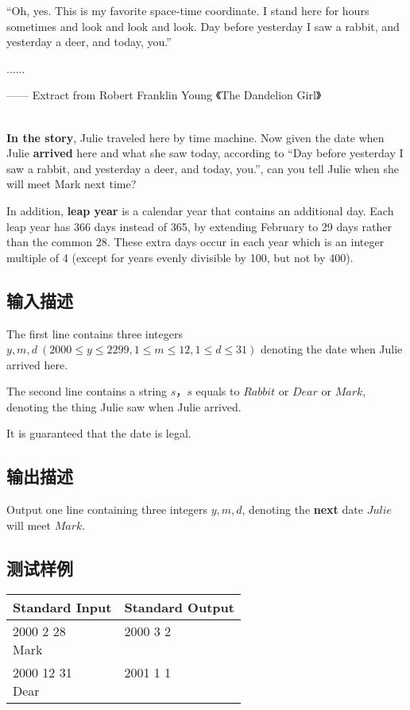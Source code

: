 ``Oh, yes. This is my favorite space-time coordinate. I stand here for hours sometimes and look and look and look. Day before yesterday I saw a rabbit, and yesterday a deer, and today, you.''

......

{\hfill —— Extract from Robert Franklin Young 《The Dandelion Girl》}

~\\

\textbf{In the story}, Julie traveled here by time machine. Now given the date when Julie \textbf{arrived} here and what she saw today, according to ``Day before yesterday I saw a rabbit, and yesterday a deer, and today, you.'', can you tell Julie when she will meet Mark next time?

In addition, \textbf{leap year} is a calendar year that contains an additional day. Each leap year has 366 days instead of 365, by extending February to 29 days rather than the common 28. These extra days occur in each year which is an integer multiple of 4 (except for years evenly divisible by 100, but not by 400). 
\subsection*{输入描述}

The first line contains three integers $y, m, d \ (2000 \le y \le 2299, 1 \le m \le 12, 1 \le d \le 31)$ denoting the date when Julie arrived here.

The second line contains a string $s$，$s$ equals to $Rabbit$ or $Dear$ or $Mark$, denoting the thing Julie saw when Julie arrived.

It is guaranteed that the date is legal.

\subsection*{输出描述}

Output one line containing three integers $y, m, d$, denoting the \textbf{next} date $Julie$ will meet $Mark$.

\subsection*{测试样例}

\begin{table}[H]
\begin{tabularx}{\textwidth}{|X|X|}
    \hline
    \textbf{Standard Input} & \textbf{Standard Output} \\ 
    \hline
    \tablecell{
        2000 2 28 \\
        Mark \\
    } & \tablecell{
        2000 3 2 \\ \\
    } \\ 
    \hline
    \tablecell{
        2000 12 31 \\
        Dear    \\
    } & \tablecell{
        2001 1 1 \\ \\
    } \\
    \hline
\end{tabularx}
\end{table}
